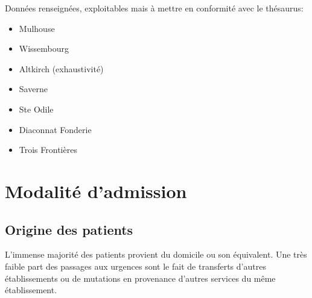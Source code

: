\documentclass[12pt,english,french,twoside]{report}\usepackage[]{graphicx}\usepackage[]{color}
\begin{document}
Données renseignées, exploitables mais à mettre en conformité avec le thésaurus:
\begin{itemize}
  \item Mulhouse
  \item Wissembourg
  \item Altkirch (exhaustivité)
  \item Saverne
  \item Ste Odile
  \item Diaconnat Fonderie
  \item Trois Frontières
\end{itemize}


\newpage
\chapter{Modalité d'admission}



\section*{Origine des patients}

L'immense majorité des patients provient du domicile ou son équivalent. Une très faible part des passages aux urgences sont le fait de transferts d'autres établissements ou de mutations en provenance d'autres services du même établissement.
\end{document}
